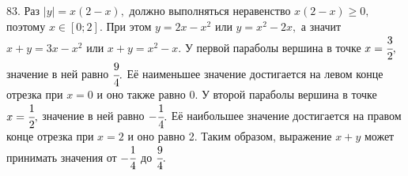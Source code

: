 83.  Раз $|y|=x(2-x),$ должно выполняться неравенство $x(2-x)\geqslant0,$ поэтому $x\in[0;2].$ При этом $y=2x-x^2$ или $y=x^2-2x,$ а значит $x+y=3x-x^2$ или $x+y=x^2-x.$ У первой параболы вершина в точке $x=\cfrac{3}{2},$ значение в ней равно $\cfrac{9}{4}.$ Её наименьшее значение достигается на левом конце отрезка при $x=0$ и оно также равно 0. У второй параболы вершина в точке $x=\cfrac{1}{2},$ значение в ней равно $-\cfrac{1}{4}.$ Её наибольшее значение достигается на правом конце отрезка при $x=2$ и оно равно 2. Таким образом, выражение $x+y$ может принимать значения от $-\cfrac{1}{4}$ до $\cfrac{9}{4}.$\\
